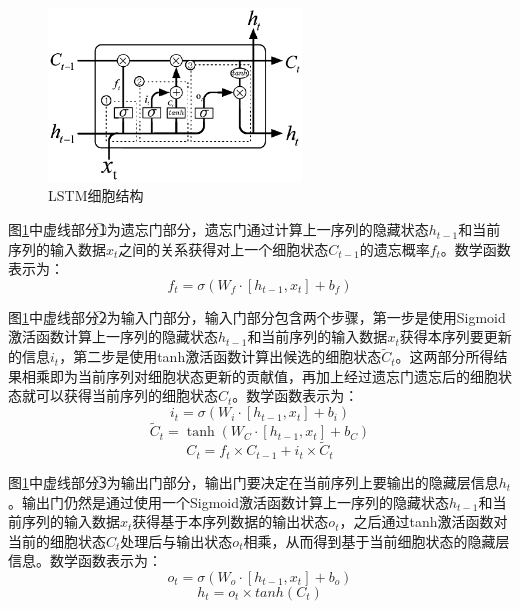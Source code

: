 \begin{figure}[thb]
\begin{center}
\includegraphics[width=0.6\textwidth]{figures/lstm.eps}
\caption{LSTM细胞结构}\label{fig:lstm}
\end{center}
\end{figure}

图\ref{fig:lstm}中虚线部分\textcircled{1}为遗忘门部分，遗忘门通过计算上一序列的隐藏状态$h_{t-1}$和当前序列的输入数据$x_t$之间的关系获得对上一个细胞状态$C_{t-1}$的遗忘概率$f_{t}$。数学函数表示为：
\begin{equation}
 f_t= \sigma(W_f \cdot [h_{t-1},x_t]+b_f)
\end{equation}

图\ref{fig:lstm}中虚线部分\textcircled{2}为输入门部分，输入门部分包含两个步骤，第一步是使用Sigmoid激活函数计算上一序列的隐藏状态$h_{t-1}$和当前序列的输入数据$x_t$获得本序列要更新的信息$i_t$，第二步是使用tanh激活函数计算出候选的细胞状态$\tilde C_t$。这两部分所得结果相乘即为当前序列对细胞状态更新的贡献值，再加上经过遗忘门遗忘后的细胞状态就可以获得当前序列的细胞状态$C_{t}$。数学函数表示为：
\begin{equation}
 i_t= \sigma(W_i \cdot [h_{t-1},x_t]+b_i)
\end{equation}
\begin{equation}
 \tilde C_t= \tanh(W_C \cdot [h_{t-1},x_t]+b_C)
\end{equation}
\begin{equation}
 C_t= f_t \times C_{t-1} + i_t \times {\tilde C_t}
\end{equation}

图\ref{fig:lstm}中虚线部分\textcircled{3}为输出门部分，输出门要决定在当前序列上要输出的隐藏层信息$h_t$。输出门仍然是通过使用一个Sigmoid激活函数计算上一序列的隐藏状态$h_{t-1}$和当前序列的输入数据$x_t$获得基于本序列数据的输出状态$o_t$，之后通过tanh激活函数对当前的细胞状态$C_t$处理后与输出状态$o_t$相乘，从而得到基于当前细胞状态的隐藏层信息。数学函数表示为：
\begin{equation}
 o_t= \sigma(W_o \cdot [h_{t-1},x_t]+b_o)
\end{equation}
\begin{equation}
 h_t= o_t \times tanh(C_t)
\end{equation}

